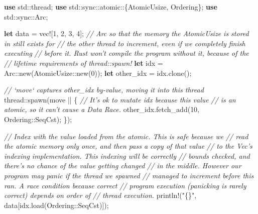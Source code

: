 \documentclass[a4paper,]{book}
\newenvironment{Shaded}{\begin{snugshade}}{\end{snugshade}}
\newcommand{\KeywordTok}[1]{\textcolor[rgb]{0.13,0.29,0.53}{\textbf{{#1}}}}
\newcommand{\DecValTok}[1]{\textcolor[rgb]{0.00,0.00,0.81}{{#1}}}
\newcommand{\StringTok}[1]{\textcolor[rgb]{0.31,0.60,0.02}{{#1}}}
\newcommand{\CommentTok}[1]{\textcolor[rgb]{0.56,0.35,0.01}{\textit{{#1}}}}
\newcommand{\OtherTok}[1]{\textcolor[rgb]{0.56,0.35,0.01}{{#1}}}
\newcommand{\NormalTok}[1]{{#1}}
\begin{document}
\begin{Shaded}
\begin{Highlighting}[]
\KeywordTok{use} \NormalTok{std::thread;}
\KeywordTok{use} \NormalTok{std::sync::atomic::\{AtomicUsize, Ordering\};}
\KeywordTok{use} \NormalTok{std::sync::Arc;}

\KeywordTok{let} \NormalTok{data = }\OtherTok{vec!}\NormalTok{[}\DecValTok{1}\NormalTok{, }\DecValTok{2}\NormalTok{, }\DecValTok{3}\NormalTok{, }\DecValTok{4}\NormalTok{];}
\CommentTok{// Arc so that the memory the AtomicUsize is stored in still exists for}
\CommentTok{// the other thread to increment, even if we completely finish executing}
\CommentTok{// before it. Rust won't compile the program without it, because of the}
\CommentTok{// lifetime requirements of thread::spawn!}
\KeywordTok{let} \NormalTok{idx = Arc::new(AtomicUsize::new(}\DecValTok{0}\NormalTok{));}
\KeywordTok{let} \NormalTok{other_idx = idx.clone();}

\CommentTok{// `move` captures other_idx by-value, moving it into this thread}
\NormalTok{thread::spawn(move || \{}
    \CommentTok{// It's ok to mutate idx because this value}
    \CommentTok{// is an atomic, so it can't cause a Data Race.}
    \NormalTok{other_idx.fetch_add(}\DecValTok{10}\NormalTok{, Ordering::SeqCst);}
\NormalTok{\});}

\CommentTok{// Index with the value loaded from the atomic. This is safe because we}
\CommentTok{// read the atomic memory only once, and then pass a copy of that value}
\CommentTok{// to the Vec's indexing implementation. This indexing will be correctly}
\CommentTok{// bounds checked, and there's no chance of the value getting changed}
\CommentTok{// in the middle. However our program may panic if the thread we spawned}
\CommentTok{// managed to increment before this ran. A race condition because correct}
\CommentTok{// program execution (panicking is rarely correct) depends on order of}
\CommentTok{// thread execution.}
\OtherTok{println!}\NormalTok{(}\StringTok{"\{\}"}\NormalTok{, data[idx.load(Ordering::SeqCst)]);}
\end{Highlighting}
\end{Shaded}
\end{document}
